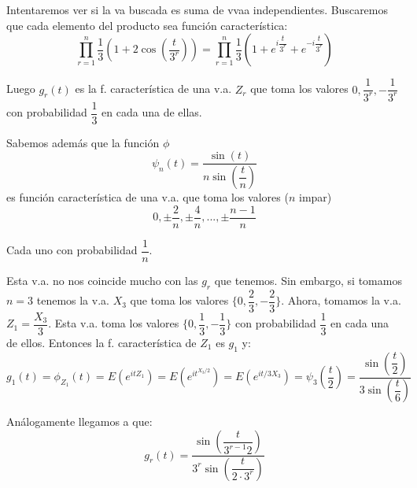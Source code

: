 \documentclass[openany]{book}
\begin{document}
\begin{exercise}
    $  $\\ 
    Intentaremos ver si la va buscada es suma de vvaa independientes. Buscaremos que cada elemento del producto sea función característica:
    $$ \prod_{r=1}^{n}\dfrac{1}{3} (1+2 \cos(\dfrac{t}{3^{r}})) = \prod_{r=1}^{n}\dfrac{1}{3} \left( 1+e^{i \dfrac{t}{3^{r}}} + e^{-i \dfrac{t}{3^{r}}} \right) $$

    Luego $ g_{r}(t)  $ es la f. característica de una v.a. $ Z_{r} $ que toma los valores $ 0,\dfrac{1}{3^{r}},-\dfrac{1}{3^{r}} $ con probabilidad $ \dfrac{1}{3} $ en cada una de ellas.

    Sabemos además que la función $ \phi $
    $$ \psi_n(t) = \dfrac{\sin(t)}{n \sin(\dfrac{t}{n})} $$
    es función característica de una v.a. que toma los valores ($ n  $ impar) 
    $$ 0, \pm \dfrac{2}{n}, \pm \dfrac{4}{n},..., \pm \dfrac{n-1}{n} $$

    Cada uno con probabilidad $ \dfrac{1}{n} $. 

    Esta v.a. no nos coincide mucho con las $ g_{r} $ que tenemos. Sin embargo, si tomamos $ n = 3 $ tenemos la v.a. $ X_3 $ que toma los valores $ \{0,\dfrac{2}{3},-\dfrac{2}{3}\} $. Ahora, tomamos la v.a. $ Z_1 = \dfrac{X_3}{3} $. Esta v.a. toma los valores $ \{0,\dfrac{1}{3},-\dfrac{1}{3}\} $ con probabilidad $ \dfrac{1}{3} $ en cada una de ellos. Entonces la f. característica de $ Z_1 $ es $ g_1 $ y:
    $$ g_1(t) = \phi_{Z_1}(t) = E(e^{itZ_1}) = E(e^{it^{X_3/2}}) = E(e^{it/3X_3}) = \psi_{3}(\dfrac{t}{2}) = \dfrac{\sin\left(\dfrac{t}{2}\right)}{3 \sin\left(\dfrac{t}{6}\right)} $$ 

    Análogamente llegamos a que:
    $$ g_{r}(t) = \dfrac{\sin(\dfrac{t}{3^{r-1}2})}{3^{r}\sin(\dfrac{t}{2\cdot 3^{r}})} $$

\end{exercise}
\end{document}
